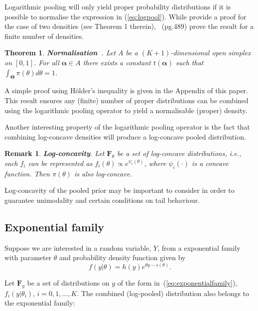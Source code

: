 \documentclass[a4paper, notitlepage, 10pt]{article}
\newtheorem{theo}{Theorem}[]
\newtheorem{remark}{Remark}[]
\begin{document}
Logarithmic pooling will only yield proper probability distributions if it is possible to normalise the expression in (\ref{eq:logpool}).
While \citet{poole2000} provide a proof for the case of two densities (see Theorem 1 therein),~\cite{genest1986A} (pg.489) prove the result for a finite number of densities.
\begin{theo}
\label{thm:normalisation}
\textbf{Normalisation~\citep{genest1986A}}. 
Let $A$ be a $(K+1)$-dimensional open simplex on $[0,1]$.
For all $\boldsymbol\alpha \in A$ there exists a constant $t(\boldsymbol\alpha)$ such that $\int_{\boldsymbol\Theta}\pi(\theta)d\theta = 1$.
\end{theo}
A simple proof using H\"{o}lder's inequality is given in the Appendix of this paper.
This result ensures any (finite) number of proper distributions can be combined using the logarithmic pooling operator to yield a normalisable (proper) density.

Another interesting property of the logarithmic pooling operator is the fact that combining log-concave densities will produce a log-concave pooled distribution.
\begin{remark}
\label{rmk:concavity}
\textbf{Log-concavity}. 
 Let $\mathbf{F}_{\theta}$ be a set of log-concave distributions, i.e., each $f_i$ can be represented as $ f_i(\theta) \propto e^{\psi_i(\theta)}$, where $\psi_i(\cdot)$ is a concave function.
Then $\pi(\theta)$ is also log-concave.
\end{remark}

Log-concavity of the pooled prior may be important to consider in order to guarantee unimodality and certain conditions on tail behaviour.

\subsection{Exponential family}
\label{sec:expofamily}

Suppose we are interested in a random variable, $Y$, from a exponential family with parameter $\theta$ and probability density function given by
\begin{equation}
\label{eq:exponentialfamily}
f(y|\theta) = h(y) e^{\theta y - s(\theta)}.
\end{equation}

Let $\mathbf{F}_{y}$ be a set of distributions on $y$ of the form in~(\ref{eq:exponentialfamily}), $f_i(y|\theta_i)$, $ i = 0, 1, \ldots, K$. 
The combined (log-pooled) distribution also belongs to the exponential family:
\end{document}
